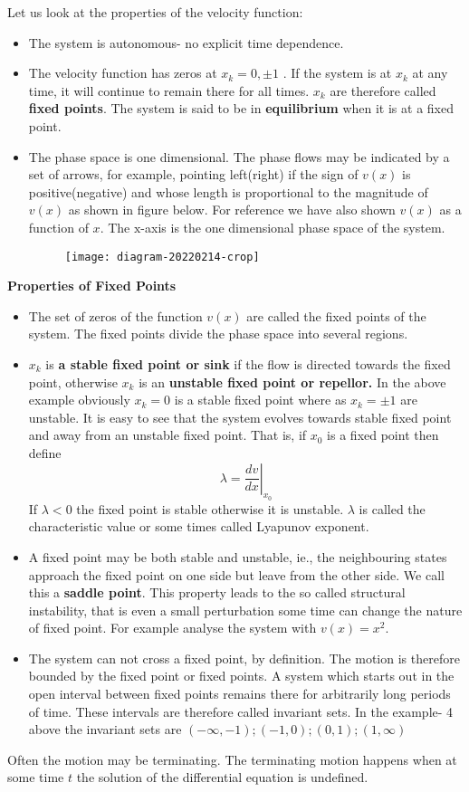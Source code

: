 Let us look at the properties of the velocity function:
\begin{itemize}
	\item The system is autonomous- no explicit time dependence.
	\item The velocity function has zeros at $x_{k}=0, \pm 1$ . If the system is at $x_{k}$ at any time, it will continue to remain there for all times. $x_{k}$ are therefore called \textbf{fixed points}. The system is said to be in \textbf{equilibrium} when it is at a fixed point.
	\item The phase space is one dimensional. The phase flows may be indicated by a set of arrows, for example, pointing left(right) if the sign of $v(x)$ is positive(negative) and whose length is proportional to the magnitude of $v(x)$ as shown in figure below. For reference we have also shown $v(x)$ as a function of $x$. The $\mathrm{x}$-axis is the one dimensional phase space of the system.\\
	\begin{figure}[H]
		\centering
		\texttt{[image: diagram-20220214-crop]}
		\caption{}
		\label{}
	\end{figure}
\end{itemize}
\textbf{ Properties of Fixed Points}
\begin{itemize}
	\item  The set of zeros of the function $v(x)$ are called the fixed points of the system. The fixed points divide the phase space into several regions.
	\item $x_{k}$ is \textbf{a stable fixed point or sink} if the flow is directed towards the fixed point, otherwise $x_{k}$ is an \textbf{unstable fixed point or repellor.} In the above example obviously $x_{k}=0$ is a stable fixed point where as $x_{k}=\pm 1$ are unstable. It is easy to see that the system evolves towards stable fixed point and away from an unstable fixed point. That is, if $x_{0}$ is a fixed point then define
	$$
	\lambda=\left.\frac{d v}{d x}\right|_{x_{0}}
	$$
	If $\lambda<0$ the fixed point is stable otherwise it is unstable. $\lambda$ is called the characteristic value or some times called Lyapunov exponent.
	\item A fixed point may be both stable and unstable, ie., the neighbouring states approach the fixed point on one side but leave from the other side. We call this a \textbf{saddle point}. This property leads to the so called structural instability, that is even a small perturbation some time can change the nature of fixed point. For example analyse the system with $v(x)=x^{2}$.
	\item The system can not cross a fixed point, by definition. The motion is therefore bounded by the fixed point or fixed points. A system which starts out in the open interval between fixed points remains there for arbitrarily long periods of time. These intervals are therefore called invariant sets. In the example- 4 above the invariant sets are $(-\infty,-1) ;(-1,0) ;(0,1) ;(1, \infty)$
\end{itemize}
Often the motion may be terminating. The terminating motion happens when at some time $t$ the solution of the differential equation is undefined.

